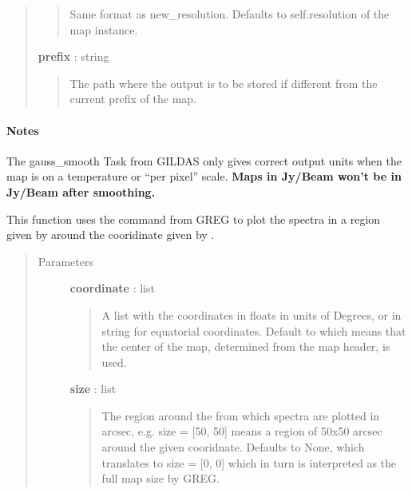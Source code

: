 \documentclass[a4paper,10pt,english]{sphinxmanual}
\begin{document}
\begin{fulllineitems}
\begin{fulllineitems}
\begin{quote}
\begin{description}
\begin{quote}
Same format as new\_resolution. Defaults to self.resolution of the
map instance.
\end{quote}

\textbf{prefix} : string
\begin{quote}

The path where the output is to be stored if different
from the current prefix of the map.
\end{quote}

\end{description}\end{quote}
\paragraph{Notes}

The gauss\_smooth Task from GILDAS only gives correct output
units when the map is on a temperature or ``per pixel'' scale.
\textbf{Maps in Jy/Beam won't be in Jy/Beam after smoothing.}

\end{fulllineitems}


\begin{fulllineitems}
\label{maps:astrolyze.maps.gildas.GildasMap.custom_go_spectrum}
This function uses the  command from GREG to plot
the spectra in a region given by  around the cooridinate given
by .
\begin{quote}\begin{description}
\item[{Parameters }] \leavevmode
\textbf{coordinate} : list
\begin{quote}

A list with the coordinates in floats in units of Degrees, or in
string for equatorial coordinates. Default to  which means
that the center of the map, determined from the map header, is
used.
\end{quote}

\textbf{size} : list
\begin{quote}

The region around the  from which spectra are plotted
in arcsec, e.g. size = {[}50, 50{]} means a region of 50x50 arcsec
around the given cooridnate. Defaults to None, which translates to
size = {[}0, 0{]} which in turn is interpreted as  the full map size
by GREG.
\end{quote}


\end{description}
\end{quote}
\end{fulllineitems}
\end{fulllineitems}
\end{document}
